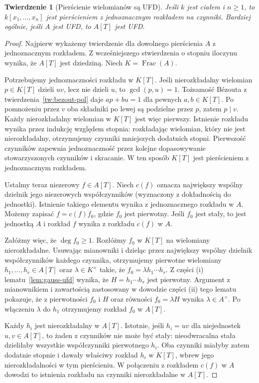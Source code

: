 \documentclass[11pt,a4paper,openany]{report}
\numberwithin{equation}{section}
\theoremstyle{plain}
\newtheorem{twierdzenie}{Twierdzenie}[section]
\theoremstyle{definition}
\theoremstyle{remark}
\newcommand{\Frac}{\operatorname{Frac}}
\begin{document}
\begin{twierdzenie}[Pierścienie wielomianów są UFD]
\label{tw:polynomial-UFD}
Jeśli $k$ jest ciałem i $n\ge1$, to
$k[x_1,\dots,x_n]$ jest pierścieniem z jednoznacznym
rozkładem na czynniki. Bardziej ogólnie, jeśli $A$
jest UFD, to $A[T]$ jest UFD.
\end{twierdzenie}
\begin{proof}
Najpierw wykażemy twierdzenie dla dowolnego pierścienia $A$
z jednoznacznym rozkładem. Z wcześniejszego stwierdzenia
o stopniu iloczynu wynika, że $A[T]$ jest dziedziną.
Niech $K=\Frac(A)$.

Potrzebujemy jednoznaczności rozkładu w $K[T]$.
Jeśli nierozkładalny wielomian $p\in K[T]$ dzieli $uv$,
lecz nie dzieli $u$, to $\gcd(p,u)=1$.
Tożsamość Bézouta z twierdzenia~\ref{tw:bezout-pol}
daje $ap+bu=1$ dla pewnych $a,b\in K[T]$.
Po pomnożeniu przez $v$ oba składniki po lewej są
podzielne przez $p$, zatem $p\mid v$.
Każdy nierozkładalny wielomian w $K[T]$ jest więc pierwszy.
Istnienie rozkładu wynika przez indukcję względem stopnia:
rozkładając wielomian, który nie jest nierozkładalny,
otrzymujemy czynniki mniejszych dodatnich stopni.
Pierwszość czynników zapewnia jednoznaczność przez
kolejne dopasowywanie stowarzyszonych czynników i skracanie.
W ten sposób $K[T]$ jest pierścieniem z jednoznacznym rozkładem.

Ustalmy teraz niezerowy $f\in A[T]$. Niech $c(f)$ oznacza
największy wspólny dzielnik jego niezerowych współczynników
(wyznaczony z dokładnością do jednostki). Istnienie takiego
elementu wynika z jednoznacznego rozkładu w $A$.
Możemy zapisać $f=c(f)f_0$, gdzie $f_0$ jest pierwotny.
Jeśli $f_0$ jest stały, to jest jednostką $A$ i
rozkład $f$ wynika z rozkładu $c(f)$ w $A$.

Załóżmy więc, że $\deg f_0\ge1$. Rozłóżmy $f_0$
w $K[T]$ na wielomiany nierozkładalne.
Usuwając mianowniki i dzieląc przez największy wspólny
dzielnik współczynników każdego czynnika, otrzymujemy
pierwotne wielomiany $h_1,\dots,h_r\in A[T]$ oraz
$\lambda\in K^\times$ takie, że
$f_0=\lambda h_1\cdots h_r$.
Z części (i) lematu~\ref{lem:gauss-ufd} wynika, że
$H=h_1\cdots h_r$ jest pierwotny.
Argument z mianownikiem i zawartością zastosowany
w dowodzie części (ii) tego lematu pokazuje, że z
pierwotności $f_0$ i $H$ oraz równości $f_0=\lambda H$
wynika $\lambda\in A^\times$.
Po włączeniu $\lambda$ do $h_1$ otrzymujemy rozkład
$f_0$ w $A[T]$.

Każdy $h_i$ jest nierozkładalny w $A[T]$.
Istotnie, jeśli $h_i=uv$ dla niejednostek $u,v\in A[T]$,
to żaden z czynników nie może być stały: nieodwracalna
stała dzieliłaby wszystkie współczynniki pierwotnego $h_i$.
Oba czynniki miałyby zatem dodatnie stopnie i dawały
właściwy rozkład $h_i$ w $K[T]$, wbrew jego
nierozkładalności w tym pierścieniu. W połączeniu z
rozkładem $c(f)$ w $A$ dowodzi to istnienia rozkładu
na czynniki nierozkładalne w $A[T]$.


\end{proof}
\end{document}
